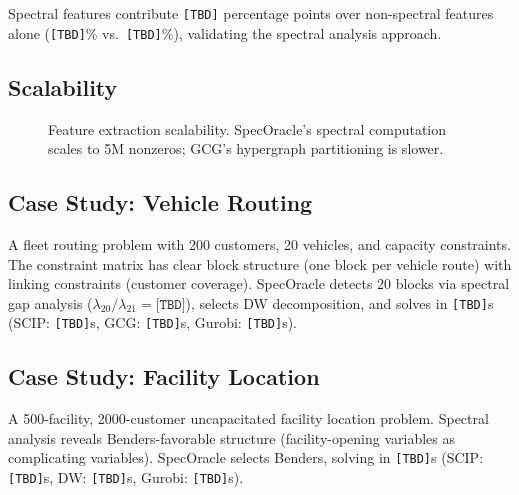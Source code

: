 \documentclass[11pt]{article}
\begin{document}
Spectral features contribute \texttt{[TBD]} percentage points over non-spectral features alone (\texttt{[TBD]}\% vs.\ \texttt{[TBD]}\%), validating the spectral analysis approach.

\subsection{Scalability}

\begin{figure}[t]
\centering
{}
\caption{Feature extraction scalability. SpecOracle's spectral computation scales to 5M nonzeros; GCG's hypergraph partitioning is slower.}
\end{figure}

\subsection{Case Study: Vehicle Routing}

A fleet routing problem with 200 customers, 20 vehicles, and capacity constraints. The constraint matrix has clear block structure (one block per vehicle route) with linking constraints (customer coverage). SpecOracle detects 20 blocks via spectral gap analysis ($\lambda_{20}/\lambda_{21} = \texttt{[TBD]}$), selects DW decomposition, and solves in \texttt{[TBD]}s (SCIP: \texttt{[TBD]}s, GCG: \texttt{[TBD]}s, Gurobi: \texttt{[TBD]}s).

\subsection{Case Study: Facility Location}

A 500-facility, 2000-customer uncapacitated facility location problem. Spectral analysis reveals Benders-favorable structure (facility-opening variables as complicating variables). SpecOracle selects Benders, solving in \texttt{[TBD]}s (SCIP: \texttt{[TBD]}s, DW: \texttt{[TBD]}s, Gurobi: \texttt{[TBD]}s).
\end{document}
